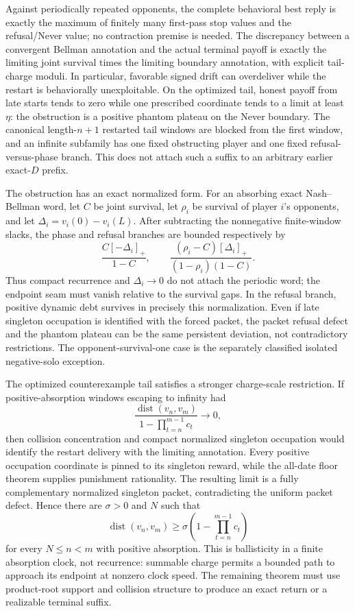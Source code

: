 \documentclass[11pt]{article}
\begin{document}
Against periodically repeated opponents, the complete behavioral best reply is
exactly the maximum of finitely many first-pass stop values and the
refusal/Never value; no contraction premise is needed.  The discrepancy between
a convergent Bellman annotation and the actual terminal payoff is exactly the
limiting joint survival times the limiting boundary annotation, with explicit
tail-charge moduli.  In particular, favorable signed drift can overdeliver
while the restart is behaviorally unexploitable.  On the optimized tail,
honest payoff from late starts tends to zero while one prescribed coordinate
tends to a limit at least \(\eta\): the obstruction is a positive phantom
plateau on the Never boundary.  The canonical length-\(n+1\) restarted tail
windows are blocked from the first window, and an infinite subfamily has one
fixed obstructing player and one fixed refusal-versus-phase branch.  This does
not attach such a suffix to an arbitrary earlier exact-$D$ prefix.

The obstruction has an exact normalized form.  For an absorbing exact
Nash--Bellman word, let \(C\) be joint survival, let \(\rho_i\) be survival of
player \(i\)'s opponents, and let
\(\Delta_i=v_i(0)-v_i(L)\).  After subtracting the nonnegative finite-window
slacks, the phase and refusal branches are bounded respectively by
\[
  \frac{C[-\Delta_i]_+}{1-C},
  \qquad
  \frac{(\rho_i-C)[\Delta_i]_+}
       {(1-\rho_i)(1-C)}.
\]
Thus compact recurrence and \(\Delta_i\to0\) do not attach the periodic word;
the endpoint seam must vanish relative to the survival gaps.  In the refusal
branch, positive dynamic debt survives in precisely this normalization.  Even
if late singleton occupation is identified with the forced packet, the packet
refusal defect and the phantom plateau can be the same persistent deviation,
not contradictory restrictions.  The opponent-survival-one case is the
separately classified isolated negative-solo exception.

The optimized counterexample tail satisfies a stronger charge-scale
restriction.  If positive-absorption windows escaping to infinity had
\[
 \frac{\operatorname{dist}(v_n,v_m)}
      {1-\prod_{t=n}^{m-1}c_t}\longrightarrow0,
\]
then collision concentration and compact normalized singleton occupation
would identify the restart delivery with the limiting annotation.  Every
positive occupation coordinate is pinned to its singleton reward, while the
all-date floor theorem supplies punishment rationality.  The resulting limit
is a fully complementary normalized singleton packet, contradicting the
uniform packet defect.  Hence there are \(\sigma>0\) and \(N\) such that
\[
 \operatorname{dist}(v_n,v_m)\geq
 \sigma\left(1-\prod_{t=n}^{m-1}c_t\right)
\]
for every \(N\leq n<m\) with positive absorption.  This is ballisticity in a
finite absorption clock, not recurrence: summable charge permits a bounded
path to approach its endpoint at nonzero clock speed.  The remaining theorem
must use product-root support and collision structure to produce an exact
return or a realizable terminal suffix.
\end{document}
